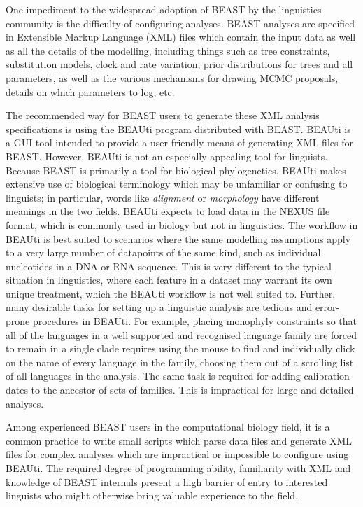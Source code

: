 \documentclass[twocolumn,10pt]{scrartcl}
\begin{document}
One impediment to the widespread adoption of BEAST by the linguistics community is the difficulty of configuring analyses.  BEAST analyses are specified in Extensible Markup Language (XML) files which contain the input data as well as all the details of the modelling, including things such as tree constraints, substitution models, clock and rate variation, prior distributions for trees and all parameters, as well as the various mechanisms for drawing MCMC proposals, details on which parameters to log, etc.

The recommended way for BEAST users to generate these XML analysis specifications is using the BEAUti program distributed with BEAST.  BEAUti is a GUI tool intended to provide a user friendly means of generating XML files for BEAST.  However, BEAUti is not an especially appealing tool for linguists.  Because BEAST is primarily a tool for biological phylogenetics, BEAUti makes extensive use of biological terminology which may be unfamiliar or confusing to linguists; in particular, words like \emph{alignment} or \emph{morphology} have different meanings in the two fields.  BEAUti expects to load data in the NEXUS file format, which is commonly used in biology but not in linguistics.  The workflow in BEAUti is best suited to scenarios where the same modelling assumptions apply to a very large number of datapoints of the same kind, such as individual nucleotides in a DNA or RNA sequence.  This is very different to the typical situation in linguistics, where each feature in a dataset may warrant its own unique treatment, which the BEAUti workflow is not well suited to.  Further, many desirable tasks for setting up a linguistic analysis are tedious and error-prone procedures in BEAUti.  For example, placing monophyly constraints so that all of the languages in a well supported and recognised language family are forced to remain in a single clade requires using the mouse to find and individually click on the name of every language in the family, choosing them out of a scrolling list of all languages in the analysis.  The same task is required for adding calibration dates to the ancestor of sets of families.  This is impractical for large and detailed analyses.

Among experienced BEAST users in the computational biology field, it is a common practice to write small scripts which parse data files and generate XML files for complex analyses which are impractical or impossible to configure using BEAUti.  The required degree of programming ability, familiarity with XML and knowledge of BEAST internals present a high barrier of entry to interested linguists who might otherwise bring valuable experience to the field.
\end{document}
